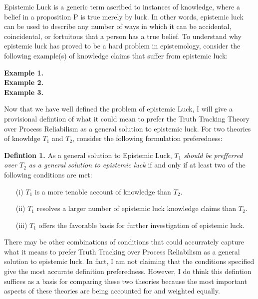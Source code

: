 \documentclass{article}
\begin{document}
Epistemic Luck is a generic term ascribed to instances of knowledge, where a
belief in a proposition P is true merely by luck. In other words, epistemic luck
can be used to describe any number of ways in which it can be accidental,
coincidental, or fortuitous that a person has a true belief. To understand why
epistemic luck has proved to be a hard problem in epistemology, consider the
following example(s) of knowledge claims that suffer from epistemic luck:

\begin{displayquote}
\textbf{Example 1.} \\

\textbf{Example 2.} \\

\textbf{Example 3.} \\
\end{displayquote}


Now that we have well defined the problem of epistemic Luck, I will give a
provisional defintion of what it could mean to prefer the Truth Tracking Theory
over Process Reliabilism as a general solution to epistemic luck. For two theories
of knowldge $T_{1}$ and $T_{2}$, consider the following formulation preferedness:
\begin{displayquote}
    \textbf{Defintion 1.} As a general solution to Epistemic Luck,
    \textit{$T_{1}$ should be prefferred over $T_{2}$ as a general solution
    to epistemic luck} if and only if at least two of the following conditions are met:
    \begin{enumerate}
        \item[(i)] $T_{1}$ is a more tenable account of knowledge than $T_{2}$.
        \item[(ii)] $T_{1}$ resolves a larger number of epistemic luck knowledge claims than $T_{2}$.
        \item[(iii)] $T_{1}$ offers the favorable basis for further investigation of epistemic luck.
    \end{enumerate}
\end{displayquote}
  There may be other combinations of conditions that could accurrately capture
what it means to prefer Truth Tracking over Process Reliabilism as a general
solution to epistemic luck. In fact, I am not claiming that the conditions
specified give the most accurate definition preferedness. However, I do think
this defintion suffices as a basis for comparing these two theories because
the most important aspects of these theories are being accounted for and weighted
equally.
\end{document}
